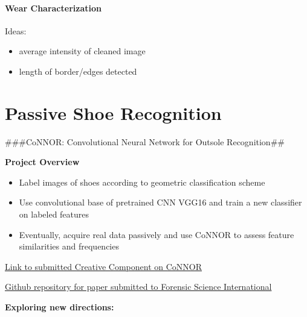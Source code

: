 \documentclass[]{book}
\providecommand{\tightlist}{%
  \setlength{\itemsep}{0pt}\setlength{\parskip}{0pt}}
\let\oldparagraph\paragraph
\renewcommand{\paragraph}[1]{\oldparagraph{#1}\mbox{}}
\begin{document}
\hypertarget{lss-paper-analysis-wear}{%
\paragraph{Wear Characterization}\label{lss-paper-analysis-wear}}

Ideas:

\begin{itemize}
\tightlist
\item
  average intensity of cleaned image
\item
  length of border/edges detected
\end{itemize}

\hypertarget{connor}{%
\section{Passive Shoe Recognition}\label{connor}}

\#\#\#CoNNOR: Convolutional Neural Network for Outsole Recognition\#\#

\textbf{Project Overview}

\begin{itemize}
\tightlist
\item
  Label images of shoes according to geometric classification scheme
\item
  Use convolutional base of pretrained CNN VGG16 and train a new classifier on labeled features
\item
  Eventually, acquire real data passively and use CoNNOR to assess feature similarities and frequencies
\end{itemize}

\href{https://lib.dr.iastate.edu/creativecomponents/264/}{Link to submitted Creative Component on CoNNOR}

\href{https://github.com/srvanderplas/CoNNORFSI}{Github repository for paper submitted to Forensic Science International}

\textbf{Exploring new directions:}
\end{document}
